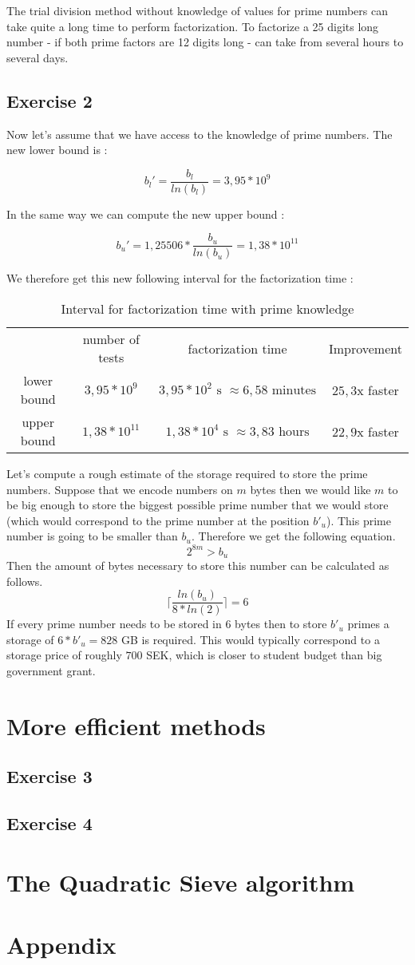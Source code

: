 \documentclass{article}
\begin{document}
The trial division method without knowledge of values for prime numbers can take quite a long time to perform factorization. To factorize a 25 digits long number - if both prime factors are 12 digits long - can take from several hours to several days.

\subsection{Exercise 2}

Now let's assume that we have access to the knowledge of prime numbers. The new lower bound is :

$$b_l'=\frac{b_l}{ln(b_l)}=3,95*10^9$$

In the same way we can compute the new upper bound :

$$b_u'=1,25506*\frac{b_u}{ln(b_u)}=1,38*10^{11}$$

We therefore get this new following interval for the factorization time :

\begin{table}[H]
    \centering
    \begin{tabular}{c|c|c|c}
         & number of tests & factorization time & Improvement \\
        lower bound & $3,95*10^9$ & $3,95*10^{2} \text{ s } \approx 6,58 \text{ minutes}$ & $25,3$x faster \\
        upper bound & $1,38*10^{11}$ & $1,38*10^{4} \text{ s } \approx 3,83 \text{ hours}$ & $22,9$x faster
    \end{tabular}
    \caption{Interval for factorization time with prime knowledge}
\end{table}

Let's compute a rough estimate of the storage required to store the prime numbers. Suppose that we encode numbers on $m$ bytes then we would like $m$ to be big enough to store the biggest possible prime number that we would store (which would correspond to the prime number at the position $b'_u$). This prime number is going to be smaller than $b_u$. Therefore we get the following equation.
$$2^{8m} > b_u$$
Then the amount of bytes necessary to store this number can be calculated as follows.
$$\lceil\frac{ln(b_u)}{8*ln(2)}\rceil=6$$
If every prime number needs to be stored in 6 bytes then to store $b'_u$ primes a storage of $6*b'_u = 828$ GB is required. This would typically correspond to a storage price of roughly $700$ SEK, which is closer to student budget than big government grant.

\section{More efficient methods}

\subsection{Exercise 3}

\subsection{Exercise 4}

\section{The Quadratic Sieve algorithm}

\section{Appendix}
\end{document}
